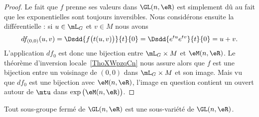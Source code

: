 \begin{proof}
    Le fait que \( f\) prenne ses valeurs dans \( \GL(n,\eR)\) est simplement dû au fait que les exponentielles sont toujours inversibles. Nous considérons ensuite la différentielle : si \( u\in \mL_G\) et \( v\in M\) nous avons
    \begin{equation}
        df_{(0,0)}(u,v)=\Dsdd{ f\big( t(u,v) \big) }{t}{0}=\Dsdd{  e^{tu} e^{tv} }{t}{0}=u+v.
    \end{equation}
    L'application \( df_0\) est donc une bijection entre \( \mL_G\times M\) et \( \eM(n,\eR)\). Le théorème d'inversion locale~\ref{ThoXWpzqCn} nous assure alors que \( f\) est une bijection entre un voisinage de \( (0,0)\) dans \( \mL_G\times M\) et son image. Mais vu que \( df_0\) est une bijection avec \( \eM(n,\eR)\), l'image en question contient un ouvert autour de \( \mtu\) dans \( \exp\big( \eM(n,\eR) \big)\).
\end{proof}

\begin{theorem}       \label{ThoOBriEoe}
    Tout sous-groupe fermé de \( \GL(n,\eR)\) est une sous-variété de \( \GL(n,\eR)\).
\end{theorem}

